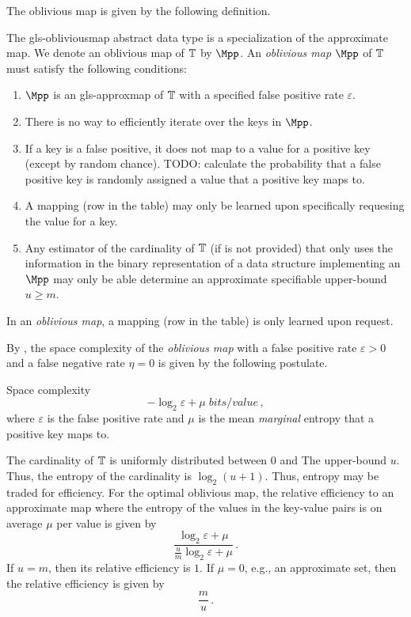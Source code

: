 \documentclass[ ../main.tex]{subfiles}
\begin{document}
The oblivious map is given by the following definition.
\begin{definition}
The \gls{gls-obliviousmap} abstract data type is a specialization of the approximate map. We denote an oblivious map of $\mathbb{T}$ by $\Mpp$. An \emph{oblivious map} $\Mpp$ of $\mathbb{T}$ must satisfy the following conditions:
\begin{enumerate}
    \item $\Mpp$ is an \gls{gls-approxmap} of $\mathbb{T}$ with a specified false positive rate $\varepsilon$.
    \item There is no way to efficiently iterate over the keys in $\Mpp$.
    \item If a key is a false positive, it does not map to a value for a positive key (except by random chance). TODO: calculate the probability that a false positive key is randomly assigned a value that a positive key maps to.
    \item A mapping (row in the table) may only be learned upon specifically requesing the value for a key.
    \item Any estimator of the cardinality of $\mathbb{T}$ (if \Count is not provided) that only uses the information in the binary representation of a data structure implementing an $\Mpp$ may only be able determine an approximate specifiable upper-bound $u \geq m$.
\end{enumerate}
\end{definition}
In an \emph{oblivious map}, a mapping (row in the table) is only learned upon request.

By \Cref{}, the space complexity of the \emph{oblivious map} with a false positive rate $\varepsilon > 0$ and a false negative rate $\eta = 0$ is given by the following postulate.
\begin{postulate}
Space complexity
\begin{equation}
    -\log_2 \varepsilon + \mu \; \si{bits \per value}\,,
\end{equation}
where $\varepsilon$ is the false positive rate and $\mu$ is the mean \emph{marginal} entropy that a positive key maps to.
\end{postulate}

The cardinality of $\mathbb{T}$ is uniformly distributed between $0$ and The upper-bound $u$. Thus, the entropy of the cardinality is $\log_2(u+1)$. Thus, entropy may be traded for efficiency. For the optimal oblivious map, the relative efficiency to an approximate map where the entropy of the values in the key-value pairs is on average $\mu$ per value is given by
\begin{equation}
    \frac{\log_2 \varepsilon + \mu}{\frac{u}{m}\log_2 \varepsilon + \mu}\,.
\end{equation}
If $u = m$, then its relative efficiency is $1$. If $\mu = 0$, e.g., an approximate set, then the relative efficiency is given by
\begin{equation}
    \frac{m}{u}\,.
\end{equation}
\end{document}
